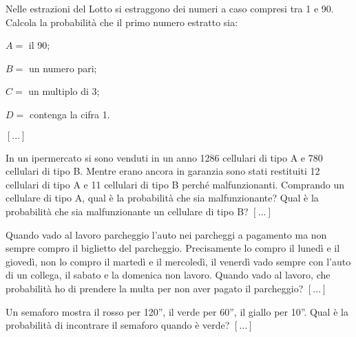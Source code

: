 \begin{esercizio}
 \label{ese:9.24}
Nelle estrazioni del Lotto si estraggono dei numeri a caso compresi tra 1 e 90. 
Calcola la probabilità che il primo numero estratto sia:
\begin{multicols}{2}
\begin{itemize*}
\item \( A= \) il 90;
\item \( B= \) un numero pari;
\item \( C= \) un multiplo di 3;
\item \( D= \) contenga la cifra 1.
\end{itemize*}
\end{multicols}
\hfill \(\left[...\right]\)
\end{esercizio}

\begin{esercizio}
 \label{ese:9.25}
In un ipermercato si sono venduti in un anno 1286 cellulari di tipo A e 780 
cellulari di tipo B. Mentre erano ancora in garanzia sono stati restituiti 12 
cellulari di tipo A e 11 cellulari di tipo B perché malfunzionanti. Comprando un 
cellulare di tipo A, qual è la probabilità che sia malfunzionante? Qual è la 
probabilità che sia malfunzionante un cellulare di tipo B?
\hfill \(\left[...\right]\)
\end{esercizio}

\begin{esercizio}
 \label{ese:9.26}
Quando vado al lavoro parcheggio l'auto nei parcheggi a pagamento ma non sempre 
compro il biglietto del parcheggio. Precisamente lo compro il lunedì e il 
giovedì, non lo compro il martedì e il mercoledì, il venerdì vado sempre con 
l'auto di un collega, il sabato e la domenica non lavoro. Quando vado al lavoro, 
che probabilità ho di prendere la multa per non aver pagato il parcheggio?
\hfill \(\left[...\right]\)
\end{esercizio}

\begin{esercizio}
 \label{ese:9.27}
Un semaforo mostra il rosso per 120'', il verde per 60'', il giallo per 10''. 
Qual è la probabilità di incontrare il semaforo quando è verde?
\hfill \(\left[...\right]\)
\end{esercizio}

